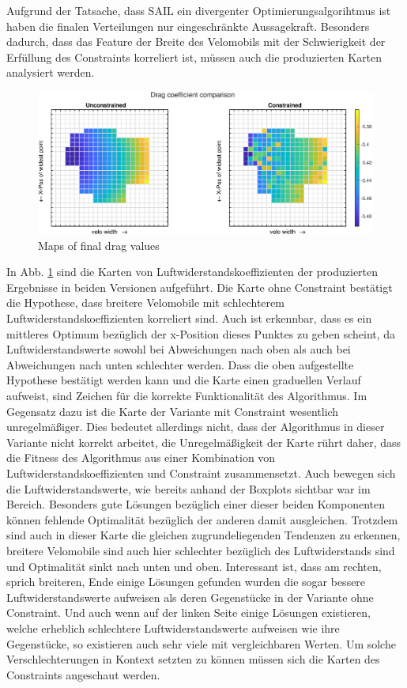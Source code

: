 Aufgrund der Tatsache, dass SAIL ein divergenter Optimierungsalgorihtmus ist haben die finalen Verteilungen nur eingeschränkte Aussagekraft.
Besonders dadurch, dass das Feature der Breite des Velomobils mit der Schwierigkeit der Erfüllung des Constraints korreliert ist, müssen auch die produzierten Karten analysiert werden.

\begin{figure}[h]
	\includegraphics[width=1\linewidth]{bilder/2pt500Samples/dragMapComparison}
	\caption{Maps of final drag values}
	\label{fig:1stmapDrag}
\end{figure}

In Abb. \cref{fig:1stmapDrag} sind die Karten von Luftwiderstandskoeffizienten der produzierten Ergebnisse in beiden Versionen aufgeführt.
Die Karte ohne Constraint bestätigt die Hypothese, dass breitere Velomobile mit schlechterem Luftwiderstandskoeffizienten korreliert sind.
Auch ist erkennbar, dass es ein mittleres Optimum bezüglich der x-Position dieses Punktes zu geben scheint, da Luftwiderstandswerte sowohl bei Abweichungen nach oben als auch bei Abweichungen nach unten schlechter werden.
Dass die oben aufgestellte Hypothese bestätigt werden kann und die Karte einen graduellen Verlauf aufweist, sind Zeichen für die korrekte Funktionalität des Algorithmus.
Im Gegensatz dazu ist die Karte der Variante mit Constraint wesentlich unregelmäßiger.
Dies bedeutet allerdings nicht, dass der Algorithmus in dieser Variante nicht korrekt arbeitet, die Unregelmäßigkeit der Karte rührt daher, dass die Fitness des Algorithmus aus einer Kombination von Luftwiderstandskoeffizienten und Constraint zusammensetzt.
Auch bewegen sich die Luftwiderstandswerte, wie bereits anhand der Boxplots sichtbar war im Bereich.
Besonders gute Lösungen bezüglich einer dieser beiden Komponenten können fehlende Optimalität bezüglich der anderen damit ausgleichen.
Trotzdem sind auch in dieser Karte die gleichen zugrundeliegenden Tendenzen zu erkennen, breitere Velomobile sind auch hier schlechter bezüglich des Luftwiderstands sind und Optimalität sinkt nach unten und oben.
Interessant ist, dass am rechten, sprich breiteren, Ende einige Lösungen gefunden wurden die sogar bessere Luftwiderstandswerte aufweisen als deren Gegenstücke in der Variante ohne Constraint.
Und auch wenn auf der linken Seite einige Lösungen existieren, welche erheblich schlechtere Luftwiderstandswerte aufweisen wie ihre Gegenstücke, so existieren auch sehr viele mit vergleichbaren Werten.
Um solche Verschlechterungen in Kontext setzten zu können müssen sich die Karten des Constraints angeschaut werden.

